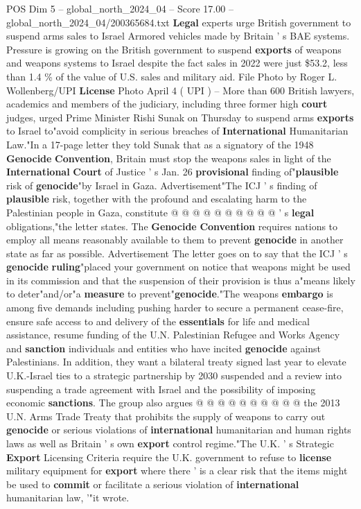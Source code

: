 \begin{textsample}{POS Dim 5 – global\_north\_2024\_04 – Score 17.00 – global\_north\_2024\_04/200365684.txt}  \label{ex:f5_pos_282}
\textbf{Legal} experts urge British government to suspend arms sales to Israel Armored vehicles made by Britain ' s BAE systems.
Pressure is growing on the British government to suspend \textbf{exports} of weapons and weapons systems to Israel despite the fact sales in 2022 were just \$53.2, less than 1.4 \% of the value of U.S. sales and military aid.
File Photo by Roger L.
Wollenberg/UPI \textbf{License} Photo April 4 ( UPI ) -- More than 600 British lawyers, academics and members of the judiciary, including three former high \textbf{court} judges, urged Prime Minister Rishi Sunak on Thursday to suspend arms \textbf{exports} to Israel to"avoid complicity in serious breaches of \textbf{International} Humanitarian Law."In a 17-page letter they told Sunak that as a signatory of the 1948 \textbf{Genocide} \textbf{Convention}, Britain must stop the weapons sales in light of the \textbf{International} \textbf{Court} of Justice ' s Jan. 26 \textbf{provisional} finding of"\textbf{plausible} risk of \textbf{genocide}"by Israel in Gaza.
Advertisement"The ICJ ' s finding of \textbf{plausible} risk, together with the profound and escalating harm to the Palestinian people in Gaza, constitute @ @ @ @ @ @ @ @ @ @ ' s \textbf{legal} obligations,"the letter states.
The \textbf{Genocide} \textbf{Convention} requires nations to employ all means reasonably available to them to prevent \textbf{genocide} in another state as far as possible.
Advertisement The letter goes on to say that the ICJ ' s \textbf{genocide} \textbf{ruling}"placed your government on notice that weapons might be used in its commission and that the suspension of their provision is thus a"means likely to deter"and/or"a \textbf{measure} to prevent"\textbf{genocide}."The weapons \textbf{embargo} is among five demands including pushing harder to secure a permanent cease-fire, ensure safe access to and delivery of the \textbf{essentials} for life and medical assistance, resume funding of the U.N.
Palestinian Refugee and Works Agency and \textbf{sanction} individuals and entities who have incited \textbf{genocide} against Palestinians.
In addition, they want a bilateral treaty signed last year to elevate U.K.-Israel ties to a strategic partnership by 2030 suspended and a review into suspending a trade agreement with Israel and the possibility of imposing economic \textbf{sanctions}.
The group also argues @ @ @ @ @ @ @ @ @ @ the 2013 U.N.
Arms Trade Treaty that prohibits the supply of weapons to carry out \textbf{genocide} or serious violations of \textbf{international} humanitarian and human rights laws as well as Britain ' s own \textbf{export} control regime."The U.K. ' s Strategic \textbf{Export} Licensing Criteria require the U.K. government to refuse to \textbf{license} military equipment for \textbf{export} where there ' is a clear risk that the items might be used to \textbf{commit} or facilitate a serious violation of \textbf{international} humanitarian law, '"it wrote.

\end{textsample}
